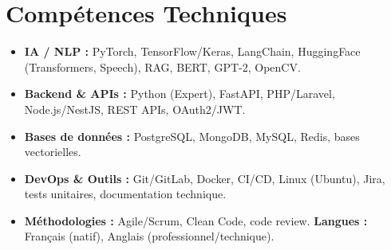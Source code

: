 \documentclass[a4paper,11pt]{article}
\begin{document}
\section{Compétences Techniques}
\begin{itemize}[leftmargin=*, nosep]
    \item \small{\textbf{IA / NLP :} PyTorch, TensorFlow/Keras, LangChain, HuggingFace (Transformers, Speech), RAG, BERT, GPT-2, OpenCV.}
    \item \small{\textbf{Backend \& APIs :} Python (Expert), FastAPI, PHP/Laravel, Node.js/NestJS, REST APIs, OAuth2/JWT.}
    \item \small{\textbf{Bases de données :} PostgreSQL, MongoDB, MySQL, Redis, bases vectorielles.}
    \item \small{\textbf{DevOps \& Outils :} Git/GitLab, Docker, CI/CD, Linux (Ubuntu), Jira, tests unitaires, documentation technique.}
    \item \small{\textbf{Méthodologies :} Agile/Scrum, Clean Code, code review. \textbf{Langues :} Français (natif), Anglais (professionnel/technique).}
\end{itemize}

\end{document}
